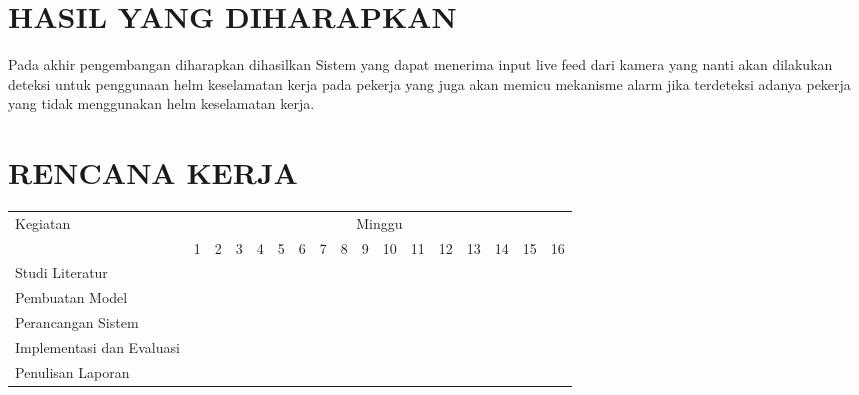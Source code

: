 \section{HASIL YANG DIHARAPKAN}

Pada akhir pengembangan diharapkan dihasilkan Sistem yang dapat menerima input live feed dari kamera yang nanti akan dilakukan deteksi untuk penggunaan helm keselamatan kerja pada pekerja yang juga akan memicu mekanisme alarm jika terdeteksi adanya pekerja yang tidak menggunakan helm keselamatan kerja.




\section{RENCANA KERJA}

\newcommand{\w}{}
\newcommand{\G}{\cellcolor{gray}}
\begin{table}[h!]
  \begin{tabular}{|p{3.5cm}|c|c|c|c|c|c|c|c|c|c|c|c|c|c|c|c|}

    \hline
    \multirow{2}{*}{Kegiatan} & \multicolumn{16}{|c|}{Minggu} \\
    \cline{2-17} &
    1 & 2 & 3 & 4 & 5 & 6 & 7 & 8 & 9 & 10 & 11 & 12 & 13 & 14 & 15 & 16 \\
    \hline

    Studi Literatur &
    \G & \G & \G & \G & \G & \w & \w & \w & \w & \w & \w & \w & \w & \w & \w & \w \\
    \hline

    Pembuatan Model &
    \w & \w & \w & \G & \G & \G & \G & \G & \w & \w & \w & \w & \w & \w & \w & \w \\
    \hline

    Perancangan Sistem &
    \w & \w & \w & \w & \w & \w & \G & \G & \G & \G & \G & \w & \w & \w & \w & \w \\
    \hline

    Implementasi dan Evaluasi &
    \w & \w & \w & \w & \w & \w & \w & \w & \w & \w & \w & \G & \w & \w & \w & \w \\
    \hline
    
    Penulisan Laporan &
    \w & \w & \w & \w & \w & \w & \w & \w & \w & \w & \w & \w & \G & \G & \G & \G \\
    \hline

  \end{tabular}
\end{table}